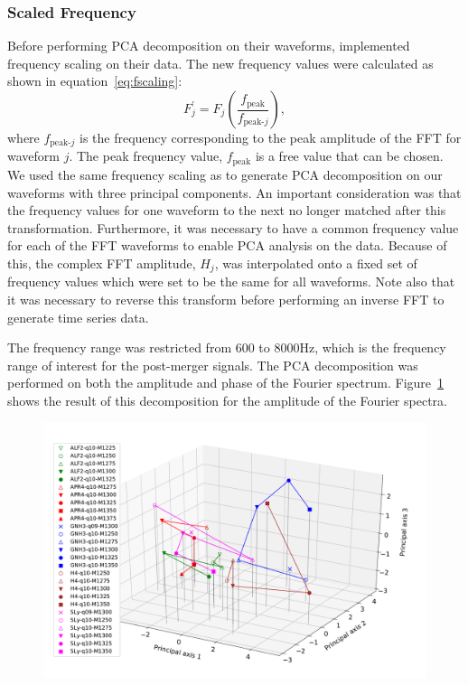 \subsubsection{Scaled Frequency}
\label{sec:PCAScaled}
Before performing PCA decomposition on their waveforms, \cite{Clark2015} implemented frequency scaling on their data. The new frequency values were calculated as  shown in equation~\ref{eq:fscaling}:
\begin{equation}
	F_j^{'}=F_j\left(\dfrac{f_{\text{peak}}}{f_{\text{peak-}j}}\right),
	\label{eq:fscaling}
\end{equation} 
where $f_{\text{peak-}j}$ is the frequency corresponding to the peak amplitude of the FFT for waveform $j$. The peak frequency value, $f_{\text{peak}}$ is a free value that can be chosen. We used the same frequency scaling as \cite{Clark2015} to generate PCA decomposition on our waveforms with three principal components. An important consideration was that the frequency values for one waveform to the next no longer matched after this transformation. Furthermore, it was necessary to have a common frequency value for each of the FFT waveforms to enable PCA analysis on the data. Because of this, the complex FFT amplitude, $H_j$, was interpolated onto a fixed set of frequency values which were set to be the same for all waveforms. Note also that it was necessary to reverse this transform before performing an inverse FFT to generate time series data.\par The frequency range was restricted from 600 to 8000Hz, which is the frequency range of interest for the post-merger signals. The PCA decomposition was performed on both the amplitude and phase of the Fourier spectrum. Figure~\ref{fig:PCAScaled3Damp} shows the result of this decomposition for the amplitude of the Fourier spectra. 
\begin{figure}[H]
	\centering
	\includegraphics[width=15cm]{./img/PCAScaled3Damp.pdf} 
	\caption[\protect]{\protect}
	\label{fig:PCAScaled3Damp}
\end{figure}
